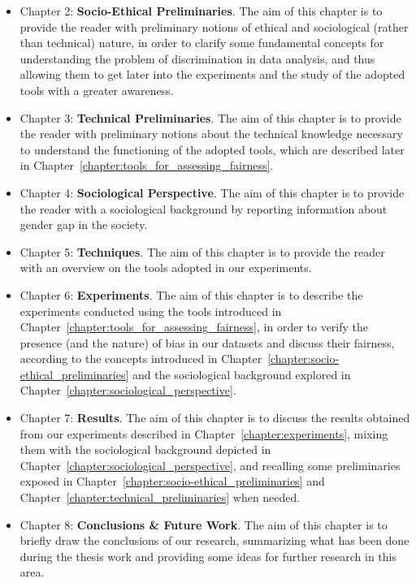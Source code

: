 \begin{itemize}
\item Chapter 2: \textbf{Socio-Ethical Preliminaries}. The aim of this chapter is to provide the reader with preliminary notions of ethical and sociological (rather than technical) nature, in order to clarify some fundamental concepts for understanding the problem of discrimination in data analysis, and thus allowing them to get later into the experiments and the study of the adopted tools with a greater awareness.
\item Chapter 3: \textbf{Technical Preliminaries}. The aim of this chapter is to provide the reader with preliminary notions about the technical knowledge necessary to understand the functioning of the adopted tools, which are described later in Chapter~\ref{chapter:tools_for_assessing_fairness}.
\item Chapter 4: \textbf{Sociological Perspective}. The aim of this chapter is to provide the reader with a sociological background by reporting information about gender gap in the society.
\item Chapter 5: \textbf{Techniques}. The aim of this chapter is to provide the reader with an overview on the tools adopted in our experiments.
\item Chapter 6: \textbf{Experiments}. The aim of this chapter is to describe the experiments conducted using the tools introduced in Chapter~\ref{chapter:tools_for_assessing_fairness}, in order to verify the presence (and the nature) of bias in our datasets and discuss their fairness, according to the concepts introduced in Chapter~\ref{chapter:socio-ethical_preliminaries} and the sociological background explored in Chapter~\ref{chapter:sociological_perspective}.
\item Chapter 7: \textbf{Results}. The aim of this chapter is to discuss the results obtained from our experiments described in Chapter~\ref{chapter:experiments}, mixing them with the sociological background depicted in Chapter~\ref{chapter:sociological_perspective}, and recalling some preliminaries exposed in Chapter~\ref{chapter:socio-ethical_preliminaries} and Chapter~\ref{chapter:technical_preliminaries} when needed.
\item Chapter 8: \textbf{Conclusions \& Future Work}. The aim of this chapter is to briefly draw the conclusions of our research, summarizing what has been done during the thesis work and providing some ideas for further research in this area.
\end{itemize}
